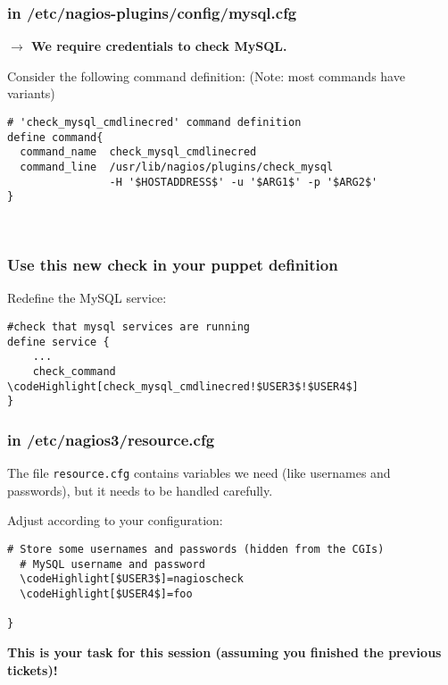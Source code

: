 \documentclass[10pt]{beamer}
\newcommand\codeHighlight[1]{\textcolor[rgb]{1,0,0}{\textbf{#1}}}
\begin{document}
\begin{frame}[fragile]
  \frametitle{in /etc/nagios-plugins/config/mysql.cfg}

\textbf{$\rightarrow$ We require credentials to check MySQL.}

\vspace{0.5cm}
Consider the following command definition: (Note: most commands have variants)
\vspace{0.5cm}

\begin{Verbatim}[commandchars=\\\[\]]
# 'check_mysql_cmdlinecred' command definition
define command{
  command_name  check_mysql_cmdlinecred
  command_line  /usr/lib/nagios/plugins/check_mysql
                -H '$HOSTADDRESS$' -u '$ARG1$' -p '$ARG2$'
}



\end{Verbatim}
\end{frame}
\begin{frame}[fragile]
  \frametitle{Use this new check in your puppet definition}

Redefine the MySQL service:

\vspace{0.5cm}

\begin{Verbatim}[commandchars=\\\[\]]
#check that mysql services are running
define service {
	...
    check_command    \codeHighlight[check_mysql_cmdlinecred!$USER3$!$USER4$]
}

\end{Verbatim}
\end{frame}

\begin{frame}[fragile]
  \frametitle{in /etc/nagios3/resource.cfg}

The file {\tt resource.cfg} contains variables we need (like usernames and passwords), but it needs to be handled carefully. 

Adjust according to your configuration:

\vspace{0.5cm}

\begin{Verbatim}[commandchars=\\\[\]]
  # Store some usernames and passwords (hidden from the CGIs)
  # MySQL username and password
  \codeHighlight[$USER3$]=nagioscheck
  \codeHighlight[$USER4$]=foo

}
\end{Verbatim}


\vspace{0.5cm}

\textbf{This is your task for this session (assuming you finished the previous tickets)!}

\end{frame}
\end{document}

